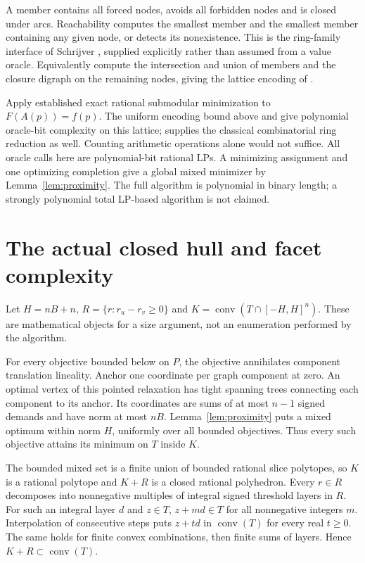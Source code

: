 \documentclass[11pt]{article}
\newcommand{\conv}{\operatorname{conv}}
\begin{document}
A member contains all forced nodes, avoids all forbidden nodes and is closed
under arcs. Reachability computes the smallest member and the smallest member
containing any given node, or detects its nonexistence. This is the ring-family
interface of Schrijver \cite[\S6]{Schrijver}, supplied explicitly rather than
assumed from a value oracle. Equivalently compute the intersection and union
of members and the closure digraph on the remaining nodes, giving the lattice
encoding of \cite[\S10.3]{GLS}.

Apply established exact rational submodular minimization to
$F(A(p))=f(p)$. The uniform encoding bound above and
\cite[\S10.2, problem~10.3.8 and its reduction]{GLS} give polynomial
oracle-bit complexity on this lattice; \cite[\S6]{Schrijver} supplies the
classical combinatorial ring reduction as well. Counting arithmetic operations
alone would not suffice. All oracle calls here are polynomial-bit rational LPs.
A minimizing assignment and one optimizing completion give a global mixed
minimizer by Lemma~\ref{lem:proximity}. The full algorithm is polynomial in
binary length; a strongly polynomial total LP-based algorithm is not claimed.

\section{The actual closed hull and facet complexity}
Let $H=nB+n$, $R=\{r:r_u-r_v\ge0\}$ and
$K=\conv(T\cap[-H,H]^n)$. These are mathematical objects for a size argument,
not an enumeration performed by the algorithm.

For every objective bounded below on $P$, the objective annihilates component
translation lineality. Anchor one coordinate per graph component at zero.
An optimal vertex of this pointed relaxation has tight spanning trees
connecting each component to its anchor. Its coordinates are sums of at most
$n-1$ signed demands and have norm at most $nB$. Lemma~\ref{lem:proximity}
puts a mixed optimum within norm $H$, uniformly over all bounded objectives.
Thus every such objective attains its minimum on $T$ inside $K$.

The bounded mixed set is a finite union of bounded rational slice polytopes,
so $K$ is a rational polytope and $K+R$ is a closed rational polyhedron.
Every $r\in R$ decomposes into nonnegative multiples of integral signed
threshold layers in $R$. For such an integral layer $d$ and $z\in T$,
$z+md\in T$ for all nonnegative integers $m$. Interpolation of consecutive
steps puts $z+td$ in $\conv(T)$ for every real $t\ge0$. The same holds for
finite convex combinations, then finite sums of layers. Hence $K+R\subset
\conv(T)$.
\end{document}
